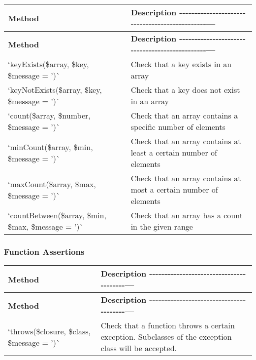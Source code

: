 \tabulinesep=1mm
\begin{longtabu} spread 0pt [c]{*{2}{|X[-1]}|}
\hline
\rowcolor{\tableheadbgcolor}\textbf{ Method  }&\textbf{ Description -\/-\/-\/-\/-\/-\/-\/-\/-\/-\/-\/-\/-\/-\/-\/-\/-\/-\/-\/-\/-\/-\/-\/-\/-\/-\/-\/-\/-\/-\/-\/-\/-\/-\/-\/-\/-\/-\/-\/-\/-\/-\/-\/-\/-\/-\/-\/---   }\\
\endfirsthead
\hline
\endfoot
\hline
\rowcolor{\tableheadbgcolor}\textbf{ Method  }&\textbf{ Description -\/-\/-\/-\/-\/-\/-\/-\/-\/-\/-\/-\/-\/-\/-\/-\/-\/-\/-\/-\/-\/-\/-\/-\/-\/-\/-\/-\/-\/-\/-\/-\/-\/-\/-\/-\/-\/-\/-\/-\/-\/-\/-\/-\/-\/-\/-\/---   }\\
\endhead
`key\+Exists(\$array, \$key, \$message = '\textquotesingle{})\`{}  &Check that a key exists in an array   \\
`key\+Not\+Exists(\$array, \$key, \$message = '\textquotesingle{})\`{}  &Check that a key does not exist in an array   \\
`count(\$array, \$number, \$message = '\textquotesingle{})\`{}  &Check that an array contains a specific number of elements   \\
`min\+Count(\$array, \$min, \$message = '\textquotesingle{})\`{}  &Check that an array contains at least a certain number of elements   \\
`max\+Count(\$array, \$max, \$message = '\textquotesingle{})\`{}  &Check that an array contains at most a certain number of elements   \\
`count\+Between(\$array, \$min, \$max, \$message = '\textquotesingle{})\`{}  &Check that an array has a count in the given range   \\
\end{longtabu}


\subsubsection*{Function Assertions}

\tabulinesep=1mm
\begin{longtabu} spread 0pt [c]{*{2}{|X[-1]}|}
\hline
\rowcolor{\tableheadbgcolor}\textbf{ Method  }&\textbf{ Description -\/-\/-\/-\/-\/-\/-\/-\/-\/-\/-\/-\/-\/-\/-\/-\/-\/-\/-\/-\/-\/-\/-\/-\/-\/-\/-\/-\/-\/-\/-\/-\/-\/-\/-\/-\/-\/-\/-\/-\/---   }\\
\endfirsthead
\hline
\endfoot
\hline
\rowcolor{\tableheadbgcolor}\textbf{ Method  }&\textbf{ Description -\/-\/-\/-\/-\/-\/-\/-\/-\/-\/-\/-\/-\/-\/-\/-\/-\/-\/-\/-\/-\/-\/-\/-\/-\/-\/-\/-\/-\/-\/-\/-\/-\/-\/-\/-\/-\/-\/-\/-\/---   }\\
\endhead
`throws(\$closure, \$class, \$message = '\textquotesingle{})\`{}  &Check that a function throws a certain exception. Subclasses of the exception class will be accepted.   \\
\end{longtabu}



